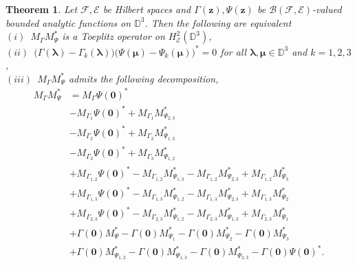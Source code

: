 \documentclass[12pt]{amsart}
\newtheorem{thm}[propn]{Theorem}
\theoremstyle{definition}
\newcommand{\D}{\mathbb{D}}
\newcommand{\1}{{\mbox{\bf 1}}}
\newcommand{\clb}{\mathcal{B}}
\newcommand{\cle}{\mathcal{E}}
\newcommand{\clf}{\mathcal{F}}
\begin{document}
\begin{thm}\label{tridisc}
Let $\clf, \cle$ be Hilbert spaces and $\Gamma(\bm{z}), \Psi(\bm{z})$ be $\clb(\clf,\cle)$-valued bounded analytic functions on $\D^3$. Then the following are equivalent \\ \vspace{1mm}
$(i)$~$M_{\Gamma}M_{\Psi}^*$ is a Toeplitz operator on $H_{\cle}^2(\D^3)$, \\ \vspace{1mm}
$(ii)$~$\big( \Gamma(\bm{\lambda}) - \Gamma_k(\bm{\lambda})\big) \big(  \Psi(\bm{\mu}) - \Psi_k(\bm{\mu}) \big)^* = 0$ for all $\bm{\lambda}, \bm{\mu} \in \D^3$ and $k=1,2,3$,\\ \vspace{1mm}
$(iii)$~$M_{\Gamma}M_{\Psi}^*$ admits the following decomposition, \vspace{1mm}
\begin{align*}
M_{\Gamma}M_{\Psi}^*  &=  M_{\Gamma} \Psi(\bm{0})^*\\
&-M_{\Gamma_1} \Psi(\bm{0})^* + M_{\Gamma_1} M_{\Psi_{2,3}}^*\\
&-M_{\Gamma_2} \Psi(\bm{0})^* + M_{\Gamma_2} M_{\Psi_{1,3}}^*\\
&-M_{\Gamma_3} \Psi(\bm{0})^* + M_{\Gamma_3} M_{\Psi_{1,2}}^*\\
&+M_{\Gamma_{1,2}} \Psi(\bm{0})^*  - M_{\Gamma_{1,2}} M_{\Psi_{1,3}}^* -  M_{\Gamma_{1,2}} M_{\Psi_{2,3}}^* + M_{\Gamma_{1,2}} M_{\Psi_{3}}^*\\
&+M_{\Gamma_{1,3}} \Psi(\bm{0})^*  - M_{\Gamma_{1,3}} M_{\Psi_{1,2}}^* -  M_{\Gamma_{1,3}} M_{\Psi_{2,3}}^* + M_{\Gamma_{1,3}} M_{\Psi_{2}}^*\\
&+M_{\Gamma_{2,3}} \Psi(\bm{0})^*  - M_{\Gamma_{2,3}} M_{\Psi_{1,2}}^* - M_{\Gamma_{2,3}} M_{\Psi_{1,3}}^* + M_{\Gamma_{2,3}} M_{\Psi_1}^* \\
&+\Gamma(\bm{0}) M_{\Psi}^*  - \Gamma(\bm{0}) M_{\Psi_{1}}^* -  \Gamma(\bm{0}) M_{\Psi_{2}}^* - \Gamma(\bm{0}) M_{\Psi_{3}}^*\\
&+\Gamma(\bm{0}) M_{\Psi_{1,2}}^*  - \Gamma(\bm{0}) M_{\Psi_{1,3}}^* -  \Gamma(\bm{0}) M_{\Psi_{2,3}}^* - \Gamma(\bm{0}) \Psi(\bm{0})^*.
\end{align*}
\end{thm}
\end{document}
